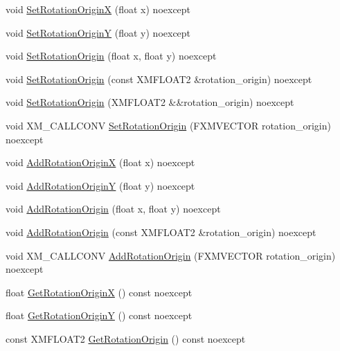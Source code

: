 \begin{DoxyCompactItemize}
\item 
void \hyperlink{structmage_1_1_texture_transform_a2be885a521d72b115ca68b6de45aca7c}{Set\+Rotation\+OriginX} (float x) noexcept
\item 
void \hyperlink{structmage_1_1_texture_transform_a6f045235afb5e5ede874a3f7e2203475}{Set\+Rotation\+OriginY} (float y) noexcept
\item 
void \hyperlink{structmage_1_1_texture_transform_a3cfeae28804ccab060ccd37fcf139259}{Set\+Rotation\+Origin} (float x, float y) noexcept
\item 
void \hyperlink{structmage_1_1_texture_transform_aa870754a35b1f4863b0a5cd3fee2ab95}{Set\+Rotation\+Origin} (const X\+M\+F\+L\+O\+A\+T2 \&rotation\+\_\+origin) noexcept
\item 
void \hyperlink{structmage_1_1_texture_transform_a82e94cf27ae9739bac742f794910e199}{Set\+Rotation\+Origin} (X\+M\+F\+L\+O\+A\+T2 \&\&rotation\+\_\+origin) noexcept
\item 
void X\+M\+\_\+\+C\+A\+L\+L\+C\+O\+NV \hyperlink{structmage_1_1_texture_transform_a41aebcbc263a678157081986a72f52af}{Set\+Rotation\+Origin} (F\+X\+M\+V\+E\+C\+T\+OR rotation\+\_\+origin) noexcept
\item 
void \hyperlink{structmage_1_1_texture_transform_a14209ac8cf9f28248fe6f2791bc6910e}{Add\+Rotation\+OriginX} (float x) noexcept
\item 
void \hyperlink{structmage_1_1_texture_transform_a05818fe4e7c2994f790db0ed4490ba1e}{Add\+Rotation\+OriginY} (float y) noexcept
\item 
void \hyperlink{structmage_1_1_texture_transform_a542d752aec7bc7d74f920dbaf78dc0c4}{Add\+Rotation\+Origin} (float x, float y) noexcept
\item 
void \hyperlink{structmage_1_1_texture_transform_aec89f0dc2732d0090802985b84418a2f}{Add\+Rotation\+Origin} (const X\+M\+F\+L\+O\+A\+T2 \&rotation\+\_\+origin) noexcept
\item 
void X\+M\+\_\+\+C\+A\+L\+L\+C\+O\+NV \hyperlink{structmage_1_1_texture_transform_a67e287acb98ea8aeeda4e3466859c8b6}{Add\+Rotation\+Origin} (F\+X\+M\+V\+E\+C\+T\+OR rotation\+\_\+origin) noexcept
\item 
float \hyperlink{structmage_1_1_texture_transform_a93637bf65911bdba80fc3b23a393fe5d}{Get\+Rotation\+OriginX} () const noexcept
\item 
float \hyperlink{structmage_1_1_texture_transform_aa4c3619818dce9c5b2a8ad489b7c74ae}{Get\+Rotation\+OriginY} () const noexcept
\item 
const X\+M\+F\+L\+O\+A\+T2 \hyperlink{structmage_1_1_texture_transform_ad23596d5d9bc99978c3bc0f54c280dec}{Get\+Rotation\+Origin} () const noexcept

\end{DoxyCompactItemize}
